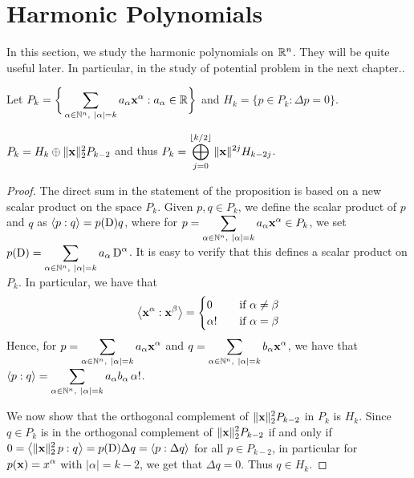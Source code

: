 \section{Harmonic Polynomials} \label{SectHramPoly}

In this section, we study the harmonic polynomials on
$\mathbb{R}^n$.  They will be quite useful later.  In particular, in the
study of potential problem in the next chapter..

Let $\displaystyle P_k
= \bigg\{ \sum_{\alpha \in \mathbb{N}^n,\ |\alpha| = k} a_{\alpha}
\mathbf{x}^{\alpha} : a_{\alpha} \in \mathbb{R}  \bigg\}$
and $H_k = \{ p \in P_k : \Delta p = 0 \}$.

\begin{prop} \label{PkHkrPkm2}
$P_k = H_k \oplus \|\mathbf{x}\|_2^2 P_{k-2}$ and thus
$\displaystyle P_k = \bigoplus_{j=0}^{\lfloor{k/2}\rfloor} \|\mathbf{x}\|^{2j} H_{k-2j}$.
\end{prop}

\begin{proof}
The direct sum in the statement of the proposition is based on a new
scalar product on the space $P_k$.  Given $p,q \in P_k$, we define the
scalar product of $p$ and $q$ as $\left\langle{p} : {q}\right\rangle = p(\operatorname{D}) q$, where
for $\displaystyle p = \sum_{\alpha \in \NN^n,\ |\alpha| = k} a_{\alpha}
\VEC{x}^{\alpha} \in P_k$, we set
$\displaystyle p(\operatorname{D}) =
\sum_{\alpha \in \mathbb{N}^n,\ |\alpha| = k} a_{\alpha} \operatorname{D}^{\alpha}$.
It is easy to verify that this defines a scalar product on $P_k$.
In particular, we have that
\[
\left\langle{\mathbf{x}^\alpha} : {\mathbf{x}^\beta}\right\rangle =
\begin{cases}
0 & \quad \text{if} \ \alpha \neq \beta \\
\alpha! & \quad \text{if} \ \alpha = \beta \\
\end{cases}
\]
Hence, for
$\displaystyle p = \sum_{\alpha \in \mathbb{N}^n,\ |\alpha| = k} a_{\alpha}
\mathbf{x}^{\alpha}$ and
$\displaystyle q = \sum_{\alpha \in \mathbb{N}^n,\ |\alpha| = k} b_{\alpha}
\mathbf{x}^{\alpha}$, we have that
$\displaystyle \psP{p}{q} = \sum_{\alpha \in \NN^n,\ |\alpha| = k} a_{\alpha}
b_{\alpha} \, \alpha!$.

We now show that the orthogonal complement of
$\displaystyle \|\mathbf{x}\|_2^2 P_{k-2}$
in $P_k$ is $H_k$.  Since $q \in P_k$ is in the orthogonal complement 
of $\displaystyle \|\mathbf{x}\|_2^2 P_{k-2}$ if and only if
$\displaystyle 0 = \left\langle{\|\mathbf{x}\|_2^2\, p} : {q}\right\rangle =  p(\operatorname{D}) \Delta q
= \left\langle{p} : {\Delta q}\right\rangle$ for all $p \in P_{k-2}$, in particular for
$\displaystyle p(\mathbf{x}) = x^{\alpha}$ with $|\alpha| = k-2$, we get
that $\Delta q = 0$.  Thus $q \in H_k$.
\end{proof}

